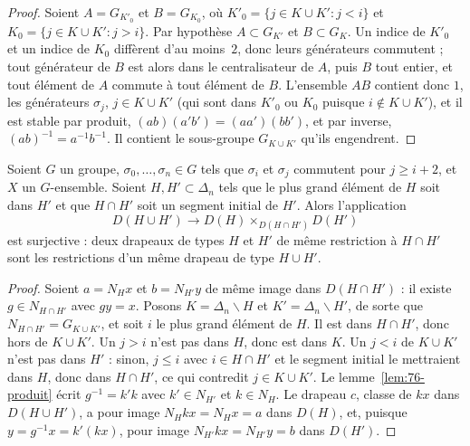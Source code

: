 \begin{proof}
Soient $A = G_{K'_0}$ et $B = G_{K_0}$, où $K'_0 = \{j \in K \cup K' : j < i\}$ et $K_0 = \{j \in K \cup K' : j > i\}$. Par hypothèse $A \subset G_{K'}$ et $B \subset G_K$. Un indice de $K'_0$ et un indice de $K_0$ diffèrent d'au moins~$2$, donc leurs générateurs commutent ; tout générateur de $B$ est alors dans le centralisateur de $A$, puis $B$ tout entier, et tout élément de $A$ commute à tout élément de $B$. L'ensemble $AB$ contient donc $1$, les générateurs $\sigma_j$, $j \in K \cup K'$ (qui sont dans $K'_0$ ou $K_0$ puisque $i \notin K \cup K'$), et il est stable par produit, $(ab)(a'b') = (aa')(bb')$, et par inverse, $(ab)^{-1} = a^{-1}b^{-1}$. Il contient le sous-groupe $G_{K \cup K'}$ qu'ils engendrent.
\end{proof}

\begin{encadre}
\begin{theoreme}\label{thm:76-lemme}
Soient $G$ un groupe, $\sigma_0, \ldots, \sigma_n \in G$ tels que $\sigma_i$ et $\sigma_j$ commutent pour $j \geq i + 2$, et $X$ un $G$-ensemble. Soient $H, H' \subset \Delta_n$ tels que le plus grand élément de $H$ soit dans $H'$ et que $H \cap H'$ soit un segment initial de $H'$. Alors l'application
\[ D(H \cup H') \longrightarrow D(H) \times_{D(H \cap H')} D(H') \]
est surjective : deux drapeaux de types $H$ et $H'$ de même restriction à $H \cap H'$ sont les restrictions d'un même drapeau de type $H \cup H'$.
\end{theoreme}
\end{encadre}

\begin{proof}
Soient $a = N_Hx$ et $b = N_{H'}y$ de même image dans $D(H \cap H')$ : il existe $g \in N_{H \cap H'}$ avec $gy = x$. Posons $K = \Delta_n \smallsetminus H$ et $K' = \Delta_n \smallsetminus H'$, de sorte que $N_{H \cap H'} = G_{K \cup K'}$, et soit $i$ le plus grand élément de $H$. Il est dans $H \cap H'$, donc hors de $K \cup K'$. Un $j > i$ n'est pas dans $H$, donc est dans $K$. Un $j < i$ de $K \cup K'$ n'est pas dans $H'$ : sinon, $j \leq i$ avec $i \in H \cap H'$ et le segment initial le mettraient dans $H$, donc dans $H \cap H'$, ce qui contredit $j \in K \cup K'$. Le lemme~\ref{lem:76-produit} écrit $g^{-1} = k'k$ avec $k' \in N_{H'}$ et $k \in N_H$. Le drapeau $c$, classe de $kx$ dans $D(H \cup H')$, a pour image $N_Hkx = N_Hx = a$ dans $D(H)$, et, puisque $y = g^{-1}x = k'(kx)$, pour image $N_{H'}kx = N_{H'}y = b$ dans $D(H')$.
\end{proof}

